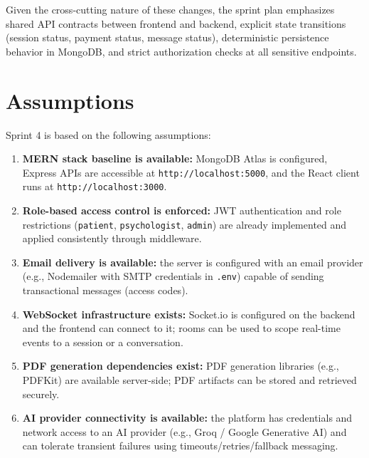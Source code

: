 \documentclass[12pt]{article}
\begin{document}
Given the cross-cutting nature of these changes, the sprint plan emphasizes shared API contracts between frontend and backend, explicit state transitions (session status, payment status, message status), deterministic persistence behavior in MongoDB, and strict authorization checks at all sensitive endpoints.

\section{Assumptions}
Sprint 4 is based on the following assumptions:
\begin{enumerate}[leftmargin=*]
  \item \textbf{MERN stack baseline is available:} MongoDB Atlas is configured, Express APIs are accessible at \texttt{http://localhost:5000}, and the React client runs at \texttt{http://localhost:3000}.
  \item \textbf{Role-based access control is enforced:} JWT authentication and role restrictions (\texttt{patient}, \texttt{psychologist}, \texttt{admin}) are already implemented and applied consistently through middleware.
  \item \textbf{Email delivery is available:} the server is configured with an email provider (e.g., Nodemailer with SMTP credentials in \texttt{.env}) capable of sending transactional messages (access codes).
  \item \textbf{WebSocket infrastructure exists:} Socket.io is configured on the backend and the frontend can connect to it; rooms can be used to scope real-time events to a session or a conversation.
  \item \textbf{PDF generation dependencies exist:} PDF generation libraries (e.g., PDFKit) are available server-side; PDF artifacts can be stored and retrieved securely.
  \item \textbf{AI provider connectivity is available:} the platform has credentials and network access to an AI provider (e.g., Groq / Google Generative AI) and can tolerate transient failures using timeouts/retries/fallback messaging.
\end{enumerate}
\end{document}

